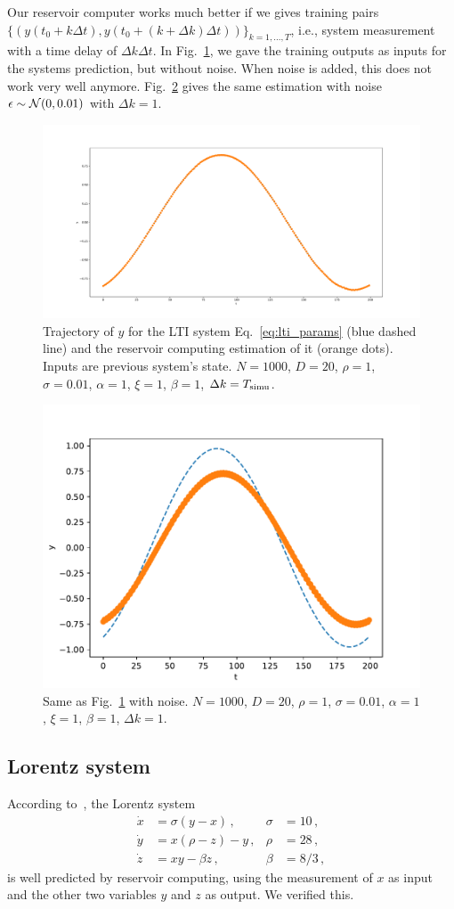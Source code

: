 \documentclass{article}
\begin{document}
Our reservoir computer works much better if we gives training pairs $\{(y(t_0+k\Delta t),y(t_0+(k+\Delta k)\Delta t))\}_{k=1,...,T}$, 
i.e., system measurement with a time delay of $\Delta k\Delta t$. 
In Fig.~\ref{fig:reservoir_lti_2}, we gave the training outputs as inputs for the systems prediction, but without noise. 
When noise is added, this does not work very well anymore. 
Fig.~\ref{fig:reservoir_lti_3} gives the same estimation with noise $\epsilon\sim{\cal N}(0,0.01)$ with $\Delta k=1$. 
\begin{figure}
 \centering
 \includegraphics[width=\textwidth]{figs/reservoir_lti_2.pdf}
 \caption{Trajectory of $y$ for the LTI system Eq.~\eqref{eq:lti_params} (blue dashed line) and the reservoir computing estimation of it (orange dots). 
 Inputs are previous system's state. 
 $N=1000$, $D=20$, $\rho=1$, $\sigma=0.01$, $\alpha=1$, $\xi=1$, $\beta=1$, $\Delta k=T_{\rm simu}$. }
 \label{fig:reservoir_lti_2}
\end{figure}
\begin{figure}
 \centering
 \includegraphics[width=.5\textwidth]{figs/reservoir_lti_3.pdf}
 \caption{Same as Fig.~\ref{fig:reservoir_lti_2} with noise. 
 $N=1000$, $D=20$, $\rho=1$, $\sigma=0.01$, $\alpha=1$, $\xi=1$, $\beta=1$, $\Delta k=1$. }
 \label{fig:reservoir_lti_3}
\end{figure}

\subsection{Lorentz system}
According to~\cite{Lu17}, the Lorentz system 
\begin{align}\label{eq:lorentz}
 \dot{x} &= \sigma(y-x)\, , & \sigma &= 10\, , \\
 \dot{y} &= x(\rho-z)-y\, , & \rho &= 28\, , \\
 \dot{z} &= xy - \beta z\, , & \beta &= 8/3\, ,
\end{align}
is well predicted by reservoir computing, using the measurement of $x$ as input and the other two variables $y$ and $z$ as output. 
We verified this. 
\end{document}
